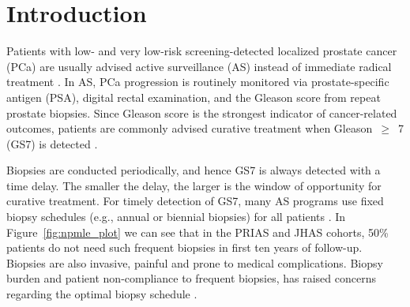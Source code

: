 \section{Introduction}
Patients with low- and very low-risk screening-detected localized prostate cancer (PCa) are usually advised active surveillance (AS) instead of immediate radical treatment \citep{briganti2018active}. In AS, PCa progression is routinely monitored via prostate-specific antigen (PSA), digital rectal examination, and the Gleason score from repeat prostate biopsies. Since Gleason score is the strongest indicator of cancer-related outcomes, patients are commonly advised curative treatment when Gleason~$\geq$~7 (GS7) is detected \citep{bul2013active}.

Biopsies are conducted periodically, and hence GS7 is always detected with a time delay. The smaller the delay, the larger is the window of opportunity for curative treatment. For timely detection of GS7, many AS programs use fixed biopsy schedules (e.g., annual or biennial biopsies) for all patients \citep{nieboer2018active,loeb2014heterogeneity}. In Figure~\ref{fig:npmle_plot} we can see that in the PRIAS and JHAS cohorts, 50\% patients do not need such frequent biopsies in first ten years of follow-up. Biopsies are also invasive, painful and prone to medical complications. Biopsy burden and patient non-compliance \citep{bokhorst2015compliance} to frequent biopsies, has raised concerns regarding the optimal biopsy schedule \citep{inoue2018comparative, bratt2013study}.

